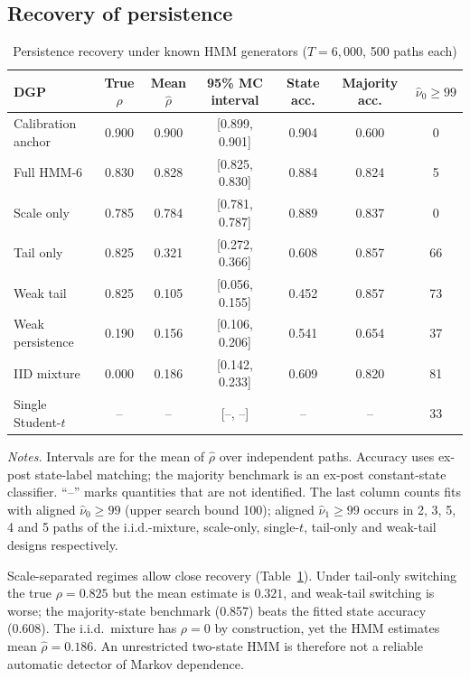 \documentclass[11pt,a4paper]{article}
\theoremstyle{plain}
\theoremstyle{remark}
\begin{document}
\subsection{Recovery of persistence}
\begin{table}[ht]
\centering\small
\caption{Persistence recovery under known HMM generators ($T=6{,}000$, 500 paths each)}\label{tab:rec}
\begin{tabular}{lcccccc}
\toprule
DGP & True $\rho$ & Mean $\hat\rho$ & 95\% MC interval & State acc. & Majority acc. & $\hat\nu_0\ge99$\\
\midrule
Calibration anchor & 0.900 & 0.900 & [0.899, 0.901] & 0.904 & 0.600 & 0\\
Full HMM-6 & 0.830 & 0.828 & [0.825, 0.830] & 0.884 & 0.824 & 5\\
Scale only & 0.785 & 0.784 & [0.781, 0.787] & 0.889 & 0.837 & 0\\
Tail only & 0.825 & 0.321 & [0.272, 0.366] & 0.608 & 0.857 & 66\\
Weak tail & 0.825 & 0.105 & [0.056, 0.155] & 0.452 & 0.857 & 73\\
Weak persistence & 0.190 & 0.156 & [0.106, 0.206] & 0.541 & 0.654 & 37\\
IID mixture & 0.000 & 0.186 & [0.142, 0.233] & 0.609 & 0.820 & 81\\
Single Student-$t$ & -- & -- & [--, --] & -- & -- & 33\\
\bottomrule
\end{tabular}
\par\smallskip\footnotesize\emph{Notes.} Intervals are for the mean of $\hat\rho$ over independent paths. Accuracy uses ex-post state-label matching; the majority benchmark is an ex-post constant-state classifier. ``--'' marks quantities that are not identified. The last column counts fits with aligned $\hat\nu_0\ge99$ (upper search bound 100); aligned $\hat\nu_1\ge99$ occurs in 2, 3, 5, 4 and 5 paths of the i.i.d.-mixture, scale-only, single-$t$, tail-only and weak-tail designs respectively.
\end{table}

Scale-separated regimes allow close recovery (Table~\ref{tab:rec}). Under tail-only switching the true $\rho=0.825$ but the mean estimate is $0.321$, and weak-tail switching is worse; the majority-state benchmark (0.857) beats the fitted state accuracy (0.608). The i.i.d.\ mixture has $\rho=0$ by construction, yet the HMM estimates mean $\hat\rho=0.186$. An unrestricted two-state HMM is therefore not a reliable automatic detector of Markov dependence.
\end{document}
